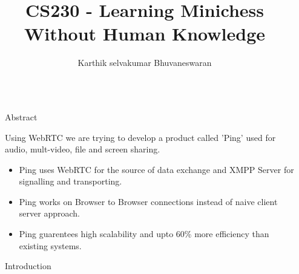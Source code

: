 \documentclass[final]{beamer}
\title{CS230 - Learning Minichess Without Human Knowledge} %
\author{Karthik selvakumar Bhuvaneswaran} %
\institute{karthik0@stanford.edu} %
\newlength{\sepwid}
\newlength{\onecolwid}
\begin{document}

\setlength{\belowcaptionskip}{2ex} %
\setlength\belowdisplayshortskip{2ex} %

\begin{frame}[t] %

\begin{columns}[t] %

\begin{column}{\sepwid}\end{column} %

\begin{column}{\onecolwid} %


\begin{alertblock}{Abstract}

Using WebRTC we are trying to develop a product called 'Ping' used for audio, mult-video, file and screen sharing.
\begin{itemize}
\item Ping uses WebRTC for the source of data exchange and XMPP Server for signalling and transporting.
\item Ping works on Browser to Browser connections instead of naive client server approach.
\item Ping guarentees high scalability and upto 60\% more efficiency than existing systems.
\end{itemize}

\end{alertblock}


\begin{block}{Introduction}


\end{block}
\end{column}
\end{columns}
\end{frame}
\end{document}
